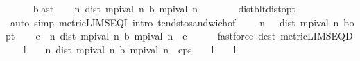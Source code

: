 \begin{isabellebody}
\ \ \ \ \isamarkupfalse%
\ blast\isanewline
\ \ \isamarkupfalse%
\ {\isachardoublequoteopen}{\isacharparenleft}{\kern0pt}{\isasymlambda}n{\isachardot}{\kern0pt}\ dist\ {\isacharparenleft}{\kern0pt}mpi{\isacharunderscore}{\kern0pt}val\ n{\isacharparenright}{\kern0pt}\ {\isacharparenleft}{\kern0pt}{\isasymL}\isactrlsub b\ {\isacharparenleft}{\kern0pt}mpi{\isacharunderscore}{\kern0pt}val\ n{\isacharparenright}{\kern0pt}{\isacharparenright}{\kern0pt}{\isacharparenright}{\kern0pt}\ {\isasymlonglonglongrightarrow}\ {}{\isachardoublequoteclose}\isanewline
\ \ \ \ \isamarkupfalse%
\ dist{\isacharunderscore}{\kern0pt}{\isasymL}\isactrlsub b{\isacharunderscore}{\kern0pt}lt{\isacharunderscore}{\kern0pt}dist{\isacharunderscore}{\kern0pt}opt\isanewline
\ \ \ \ \isamarkupfalse%
\ {\isacharparenleft}{\kern0pt}auto\ simp{\isacharcolon}{\kern0pt}\ metric{\isacharunderscore}{\kern0pt}LIMSEQ{\isacharunderscore}{\kern0pt}I\ intro{\isacharcolon}{\kern0pt}\ tendsto{\isacharunderscore}{\kern0pt}sandwich{\isacharbrackleft}{\kern0pt}of\ {\isachardoublequoteopen}{\isasymlambda}{\isacharunderscore}{\kern0pt}{\isachardot}{\kern0pt}\ {}{\isachardoublequoteclose}\ {\isacharunderscore}{\kern0pt}\ {\isacharunderscore}{\kern0pt}\ {\isachardoublequoteopen}{\isasymlambda}n{\isachardot}{\kern0pt}\ {}\ {\isacharasterisk}{\kern0pt}\ dist\ {\isacharparenleft}{\kern0pt}mpi{\isacharunderscore}{\kern0pt}val\ n{\isacharparenright}{\kern0pt}\ {\isasymnu}\isactrlsub b{\isacharunderscore}{\kern0pt}opt{\isachardoublequoteclose}{\isacharbrackright}{\kern0pt}{\isacharparenright}{\kern0pt}\isanewline
\ \ \isamarkupfalse%
\ {\isachardoublequoteopen}{\isasymforall}e\ {\isachargreater}{\kern0pt}{}{\isachardot}{\kern0pt}\ {\isasymexists}n{\isachardot}{\kern0pt}\ dist\ {\isacharparenleft}{\kern0pt}mpi{\isacharunderscore}{\kern0pt}val\ n{\isacharparenright}{\kern0pt}\ {\isacharparenleft}{\kern0pt}{\isasymL}\isactrlsub b\ {\isacharparenleft}{\kern0pt}mpi{\isacharunderscore}{\kern0pt}val\ n{\isacharparenright}{\kern0pt}{\isacharparenright}{\kern0pt}\ {\isacharless}{\kern0pt}\ e{\isachardoublequoteclose}\isanewline
\ \ \ \ \isamarkupfalse%
\ {\isacharparenleft}{\kern0pt}fastforce\ dest{\isacharbang}{\kern0pt}{\isacharcolon}{\kern0pt}\ metric{\isacharunderscore}{\kern0pt}LIMSEQ{\isacharunderscore}{\kern0pt}D{\isacharparenright}{\kern0pt}\isanewline
\ \ \isamarkupfalse%
\ {\isachardoublequoteopen}l\ {\isasymnoteq}\ {}\ {\isasymLongrightarrow}\ {\isasymexists}n{\isachardot}{\kern0pt}\ dist\ {\isacharparenleft}{\kern0pt}mpi{\isacharunderscore}{\kern0pt}val\ n{\isacharparenright}{\kern0pt}\ {\isacharparenleft}{\kern0pt}{\isasymL}\isactrlsub b\ {\isacharparenleft}{\kern0pt}mpi{\isacharunderscore}{\kern0pt}val\ n{\isacharparenright}{\kern0pt}{\isacharparenright}{\kern0pt}\ {\isacharless}{\kern0pt}\ eps\ {\isacharasterisk}{\kern0pt}\ {\isacharparenleft}{\kern0pt}{}\ {\isacharminus}{\kern0pt}\ l{\isacharparenright}{\kern0pt}\ {\isacharslash}{\kern0pt}\ {\isacharparenleft}{\kern0pt}{}\ {\isacharasterisk}{\kern0pt}\ l{\isacharparenright}{\kern0pt}{\isachardoublequoteclose}\isanewline

\end{isabellebody}

